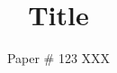 \documentclass[10pt,twocolumn]{article}
\begin{document}
\title{\bf Title}
\author{Paper \# 123 XXX}
\date{}
\maketitle
\thispagestyle{empty}

%

%
%






 
\end{document}
